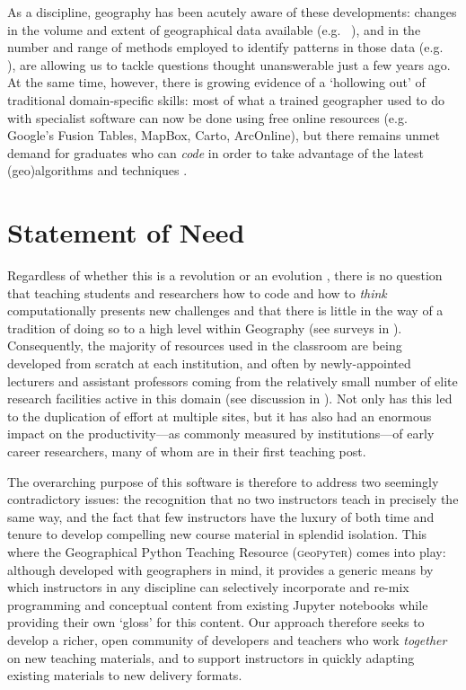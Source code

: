 \documentclass[letter, 11pt,titlepage]{article}
\newcommand{\eg}{e.g.~\/}
\begin{document}
As a discipline, geography has been acutely aware of these developments: changes
in the volume and extent of geographical data available (\eg
\citealp{Graham2013,gonzalez2013big,reades2016}), and in the number and range of
methods employed to identify patterns in those data (\eg
\citealp{Fan2016,Naik2017,Santibanez2015,Stevens2015,ArribasBel2017}), are
allowing us to tackle questions thought unanswerable just a few years ago. At
the same time, however, there is growing evidence of a `hollowing out' of
traditional domain-specific skills: most of what a trained geographer used to do
with specialist software can now be done using free online resources (\eg
Google's Fusion Tables, MapBox, Carto, ArcOnline), but there remains unmet
demand for graduates who can \textit{code} in order to take advantage of the
latest (geo)algorithms and techniques \citep{Singleton2014,Singleton2016}.

\section{Statement of Need}

Regardless of whether this is a revolution \citep{Wyly2014,Torrens2010} or an
evolution \citep{Barnes2013,Barnes2014,ArribasBel2018}, there is no question
that teaching students and researchers how to code and how to \textit{think}
computationally presents new challenges
\citep{Etherington2016,Muller2014,rey_09jgs} and that there is little in the way of a tradition of doing so to a high level within Geography (see surveys in \citealp{Bowlick2017,Bowlick2018}). Consequently, the majority of resources used in the
classroom are being developed from scratch at each institution, and often by
newly-appointed lecturers and assistant professors coming from the relatively
small number of elite research facilities active in this domain (see discussion
in \citealp{esrc2013}). Not only has this led to the duplication of effort at
multiple sites, but it has also had an enormous impact on the productivity---as
commonly measured by institutions---of early career researchers, many of whom
are in their first teaching post.

The overarching purpose of this software is therefore to address two seemingly
contradictory issues: the recognition that no two instructors teach in precisely
the same way, and the fact that few instructors have the luxury of both time and
tenure to develop compelling new course material in splendid isolation. This
where the Geographical Python Teaching Resource
(\textsc{g}eo\textsc{p}y\textsc{t}e\textsc{r}) comes into play: although
developed with geographers in mind, it provides a generic means by which
instructors in any discipline can selectively incorporate and re-mix programming
and conceptual content from existing Jupyter notebooks while providing their own
`gloss' for this content. Our approach therefore seeks to develop a richer, open
community of developers and teachers who work \textit{together} on new teaching
materials, and to support instructors in quickly adapting existing materials to
new delivery formats.
\end{document}
